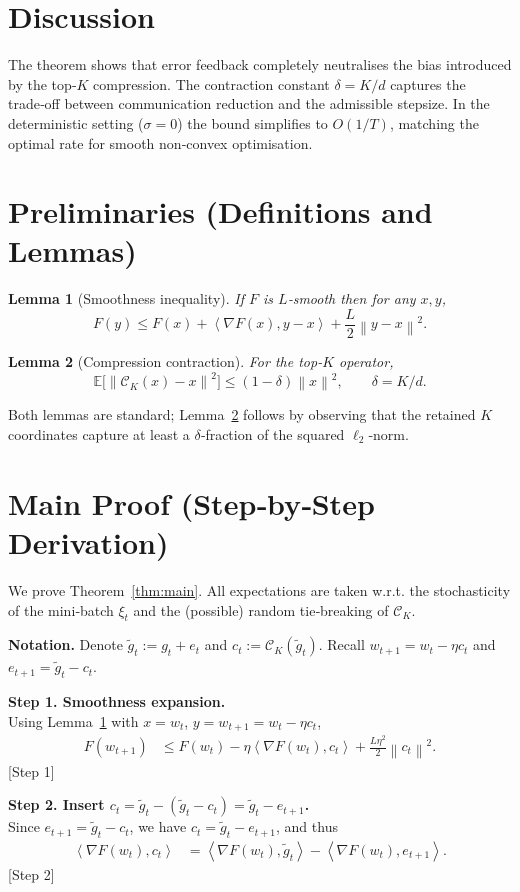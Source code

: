\documentclass{article}
\newtheorem{lemma}{Lemma}
\newcommand{\E}{\mathbb{E}}
\newcommand{\norm}[1]{\left\lVert #1 \right\rVert}
\newcommand{\inner}[2]{\left\langle #1,#2 \right\rangle}
\newcommand{\topk}{\mathcal{C}_K}
\begin{document}
\section*{Discussion}
The theorem shows that error feedback completely neutralises the bias introduced by the top‑$K$ compression.  The contraction constant $\delta=K/d$ captures the trade‑off between communication reduction and the admissible stepsize.  In the deterministic setting ($\sigma=0$) the bound simplifies to $O(1/T)$, matching the optimal rate for smooth non‑convex optimisation.

\newpage
\section*{Preliminaries (Definitions and Lemmas)}
\begin{lemma}[Smoothness inequality]\label{lem:smooth}
If $F$ is $L$‑smooth then for any $x,y$,
\[
F(y) \le F(x) + \inner{\nabla F(x)}{y-x} + \frac{L}{2}\norm{y-x}^2 .
\]
\end{lemma}
\begin{lemma}[Compression contraction]\label{lem:compress}
For the top‑$K$ operator,
\[
\E\!\big[\norm{\topk(x)-x}^2\big]\le (1-\delta)\norm{x}^2,
\qquad \delta = K/d .
\]
\end{lemma}
Both lemmas are standard; Lemma~\ref{lem:compress} follows by observing that the retained $K$ coordinates capture at least a $\delta$‑fraction of the squared $\ell_2$‑norm.

\section*{Main Proof (Step‑by‑Step Derivation)}
We prove Theorem~\ref{thm:main}.  All expectations are taken w.r.t. the stochasticity of the mini‑batch $\xi_t$ and the (possible) random tie‑breaking of $\topk$.

\bigskip
\noindent\textbf{Notation.}
Denote $\tilde g_t:=g_t+e_t$ and $c_t:=\topk(\tilde g_t)$.  Recall $w_{t+1}=w_t-\eta c_t$ and $e_{t+1}= \tilde g_t-c_t$.

\bigskip
\noindent\textbf{Step 1. Smoothness expansion.}\\
Using Lemma~\ref{lem:smooth} with $x=w_t$, $y=w_{t+1}=w_t-\eta c_t$,
\begin{align}
F(w_{t+1})
&\le F(w_t) -\eta\inner{\nabla F(w_t)}{c_t}
   +\frac{L\eta^{2}}{2}\norm{c_t}^{2}. \tag{2}
\end{align}
[Step 1]

\bigskip
\noindent\textbf{Step 2. Insert $c_t=\tilde g_t-(\tilde g_t-c_t) = \tilde g_t-e_{t+1}$.}\\
Since $e_{t+1}= \tilde g_t-c_t$, we have $c_t = \tilde g_t-e_{t+1}$, and thus
\begin{align}
\inner{\nabla F(w_t)}{c_t}
&= \inner{\nabla F(w_t)}{\tilde g_t}
   -\inner{\nabla F(w_t)}{e_{t+1}}. \tag{3}
\end{align}
[Step 2]
\end{document}
